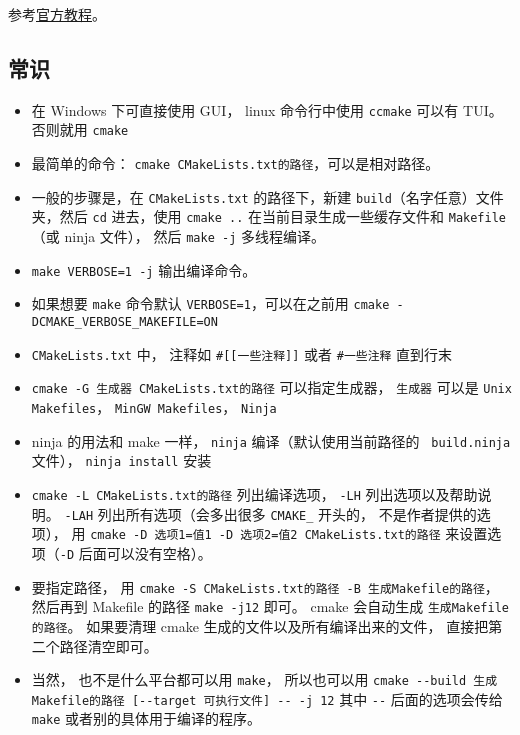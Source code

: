 


参考\href{https://cmake.org/cmake/help/latest/guide/tutorial/index.html}{官方教程}。

\subsection{常识}
\begin{itemize}
\item 在 Windows 下可直接使用 GUI， linux 命令行中使用 \verb`ccmake` 可以有 TUI。 否则就用 \verb`cmake`
\item 最简单的命令： \verb`cmake CMakeLists.txt的路径`，可以是相对路径。 
\item 一般的步骤是，在 \verb`CMakeLists.txt` 的路径下，新建 \verb`build`（名字任意）文件夹，然后 \verb`cd` 进去，使用 \verb`cmake ..` 在当前目录生成一些缓存文件和 \verb`Makefile`（或 ninja 文件）， 然后 \verb`make -j` 多线程编译。
\item \verb`make VERBOSE=1 -j` 输出编译命令。
\item 如果想要 \verb`make` 命令默认 \verb`VERBOSE=1`，可以在之前用 \verb`cmake -DCMAKE_VERBOSE_MAKEFILE=ON`
\item \verb`CMakeLists.txt` 中， 注释如 \verb`#[[一些注释]]` 或者 \verb`#一些注释` 直到行末
\item \verb`cmake -G 生成器 CMakeLists.txt的路径` 可以指定生成器， \verb`生成器` 可以是 \verb`Unix Makefiles`， \verb`MinGW Makefiles`， \verb`Ninja`
\item ninja 的用法和 make 一样， \verb`ninja` 编译（默认使用当前路径的 \verb` build.ninja` 文件）， \verb`ninja install` 安装
\item \verb`cmake -L CMakeLists.txt的路径` 列出编译选项， \verb`-LH` 列出选项以及帮助说明。 \verb`-LAH` 列出所有选项（会多出很多 \verb`CMAKE_` 开头的， 不是作者提供的选项）， 用 \verb`cmake -D 选项1=值1 -D 选项2=值2 CMakeLists.txt的路径` 来设置选项（\verb`-D` 后面可以没有空格）。
\item 要指定路径， 用 \verb`cmake -S CMakeLists.txt的路径 -B 生成Makefile的路径`， 然后再到 Makefile 的路径 \verb`make -j12` 即可。 cmake 会自动生成 \verb`生成Makefile的路径`。 如果要清理 cmake 生成的文件以及所有编译出来的文件， 直接把第二个路径清空即可。
\item 当然， 也不是什么平台都可以用 \verb`make`， 所以也可以用 \verb`cmake --build 生成Makefile的路径 [--target 可执行文件] -- -j 12` 其中 \verb`--` 后面的选项会传给 \verb`make` 或者别的具体用于编译的程序。

\end{itemize}
